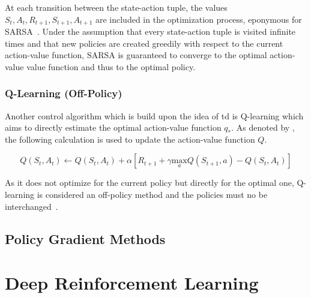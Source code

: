 \documentclass[draft,final]{vutinfth} %
\begin{document}
    At each transition between the state-action tuple, the values $S_{t},A_{t},R_{t+1},S_{t+1},A_{t+1}$ are included in the optimization process, eponymous for SARSA~\citep{sutton_reinforcement_2018}.
    Under the assumption that every state-action tuple is visited infinite times and that new policies are created greedily with respect to the current action-value function, SARSA is guaranteed to converge to the optimal action-value value function and thus to the optimal policy.



    \subsection{Q-Learning (Off-Policy)}\label{subsec:q-learningnulloff-policynull}

    Another control algorithm which is build upon the idea of \gls{td} is Q-learning which aims to directly estimate the optimal action-value function $q_*$.
    As denoted by \citeauthor{watkins_q-learning_1992}, the following calculation is used to update the action-value function $Q$.

    \begin{equation}
        Q(S_t,A_t) \leftarrow Q(S_t,A_t) + \alpha [R_{t+1} + \gamma \underset{a}{\text{max}} Q(S_{t+1},a) - Q(S_{t},A_{t}) ]
    \end{equation}

    As it does not optimize for the current policy but directly for the optimal one, Q-learning is considered an off-policy method and the policies must no be interchanged~\citep{szepesvari_algorithms_2010}.



    \section{Policy Gradient Methods}


    \chapter{Deep Reinforcement Learning}\label{ch:deep-reinforcement-learning}
\end{document}
